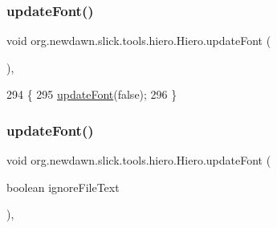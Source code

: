 \subsubsection{\texorpdfstring{update\+Font()}{updateFont()}\hspace{0.1cm}{\footnotesize\ttfamily [1/2]}}
{\footnotesize\ttfamily void org.\+newdawn.\+slick.\+tools.\+hiero.\+Hiero.\+update\+Font (\begin{DoxyParamCaption}{ }\end{DoxyParamCaption})\hspace{0.3cm}{\ttfamily [inline]}, {\ttfamily [private]}}


\begin{DoxyCode}
294                                \{
295         \mbox{\hyperlink{classorg_1_1newdawn_1_1slick_1_1tools_1_1hiero_1_1_hiero_aaee4b931c33090913c970c8484c90af7}{updateFont}}(\textcolor{keyword}{false});
296     \}
\end{DoxyCode}
\mbox{\label{classorg_1_1newdawn_1_1slick_1_1tools_1_1hiero_1_1_hiero_aae5e5b00d0e71e6e629bc335df940d92}} 
\subsubsection{\texorpdfstring{update\+Font()}{updateFont()}\hspace{0.1cm}{\footnotesize\ttfamily [2/2]}}
{\footnotesize\ttfamily void org.\+newdawn.\+slick.\+tools.\+hiero.\+Hiero.\+update\+Font (\begin{DoxyParamCaption}\item[{boolean}]{ignore\+File\+Text }\end{DoxyParamCaption})\hspace{0.3cm}{\ttfamily [inline]}, {\ttfamily [private]}}


